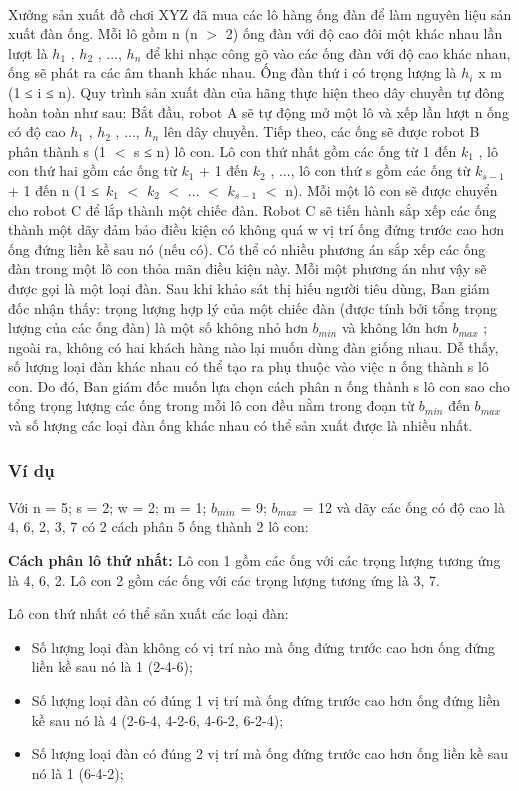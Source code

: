 

 

Xưởng sản xuất đồ chơi XYZ đã mua các lô hàng ống đàn để làm nguyên liệu sản xuất đàn ống. Mỗi lô gồm n (n $>$ 2) ống đàn với độ cao đôi một khác nhau lần lượt là $h_{1}$ , $h_{2}$ , ..., $h_{n}$ để khi nhạc công gõ vào các ống đàn với độ cao khác nhau, ống sẽ phát ra các âm thanh khác nhau. Ống đàn thứ i có trọng lượng là $h_{i}$ x m (1 ≤ i ≤ n). Quy trình sản xuất đàn của hãng thực hiện theo dây chuyền tự đông hoàn toàn như sau: Bắt đầu, robot A sẽ tự động mở một lô và xếp lần lượt n ống có độ cao $h_{1}$ , $h_{2}$ , ..., $h_{n}$ lên dây chuyền. Tiếp theo, các ống sẽ được robot B phân thành s (1 $<$ s ≤ n) lô con. Lô con thứ nhất gồm các ống từ 1 đến $k_{1}$ , lô con thứ hai gồm các ống từ $k_{1}$ + 1 đến $k_{2}$ , ..., lô con thứ s gồm các ống từ $k_{s-1}$ + 1 đến n (1 ≤ $k_{1}$ $<$ $k_{2}$ $<$ ... $<$ $k_{s-1}$ $<$ n). Mỗi một lô con sẽ được chuyển cho robot C để lắp thành một chiếc đàn. Robot C sẽ tiến hành sắp xếp các ống thành một dãy đảm bảo điều kiện có không quá w vị trí ống đứng trước cao hơn ống đứng liền kề sau nó (nếu có). Có thể có nhiều phương án sắp xếp các ống đàn trong một lô con thỏa mãn điều kiện này. Mỗi một phương án như vậy sẽ được gọi là một loại đàn. Sau khi khảo sát thị hiếu người tiêu dùng, Ban giám đốc nhận thấy: trọng lượng hợp lý của một chiếc đàn (được tính bởi tổng trọng lượng của các ống đàn) là một số không nhỏ hơn $b_{min}$ và không lớn hơn $b_{max}$ ; ngoài ra, không có hai khách hàng nào lại muốn dùng đàn giống nhau. Dễ thấy, số lượng loại đàn khác nhau có thể tạo ra phụ thuộc vào việc n ống thành s lô con. Do đó, Ban giám đốc muốn lựa chọn cách phân n ống thành s lô con sao cho tổng trọng lượng các ống trong mỗi lô con đều nằm trong đoạn từ $b_{min}$ đến $b_{max}$ và số lượng các loại đàn ống khác nhau có thể sản xuất được là nhiều nhất.

\subsubsection{Ví dụ}

Với n = 5; s = 2; w = 2; m = 1; $b_{min}$ = 9; $b_{max}$ = 12 và dãy các ống có độ cao là 4, 6, 2, 3, 7 có 2 cách phân 5 ống thành 2 lô con:

\textbf{Cách phân lô thứ nhất: } Lô con 1 gồm các ống với các trọng lượng tương ứng là 4, 6, 2. Lô con 2 gồm các ống với các trọng lượng tương ứng là 3, 7.

Lô con thứ nhất có thể sản xuất các loại đàn:
\begin{itemize}
	\item Số lượng loại đàn không có vị trí nào mà ống đứng trước cao hơn ống đứng liền kề sau nó là 1 (2-4-6);
	\item Số lượng loại đàn có đúng 1 vị trí mà ống đứng trước cao hơn ống đứng liền kề sau nó là 4 (2-6-4, 4-2-6, 4-6-2, 6-2-4);
	\item Số lượng loại đàn có đúng 2 vị trí mà ống đứng trước cao hơn ống liền kề sau nó là 1 (6-4-2);
\end{itemize}

